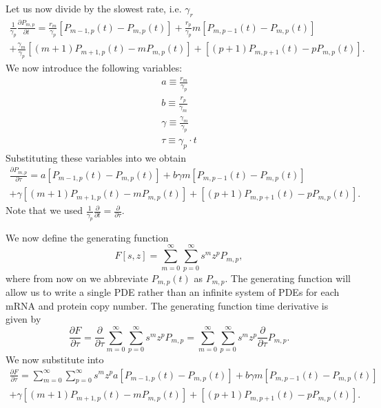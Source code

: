 Let us now divide by the slowest rate, i.e. $\gamma_r$
\begin{equation}
\begin{aligned}
\frac{1}{\gamma_p} \frac{\partial P_{m,p}}{\partial t} =
\frac{r_m}{\gamma_p} \left[ P_{m-1,p}(t) - P_{m,p}(t) \right]
+ \frac{r_p}{\gamma_p} m  \left[ P_{m, p-1}(t) - P_{m, p}(t) \right]\\
+ \frac{\gamma_m}{\gamma_p} \left[ (m + 1) P_{m+1,p}(t) - m P_{m, p}(t)
\right]
+ \left[ (p + 1) P_{m, p+1}(t) - p P_{m, p}(t) \right].
\end{aligned}
\label{eq_cme_over_gammap}
\end{equation}
We now introduce the following variables:
\begin{align}
  a \equiv \frac{r_m}{\gamma_p}\\
  b \equiv \frac{r_p}{\gamma_m}\\
  \gamma \equiv \frac{\gamma_m}{\gamma_p}\\
  \tau \equiv \gamma_p \cdot t
\end{align}
Substituting these variables into  we obtain
\begin{equation}
\begin{aligned}
\frac{\partial P_{m,p}}{\partial \tau} =
a \left[ P_{m-1,p}(t) - P_{m,p}(t) \right]
+ b \gamma m  \left[ P_{m, p-1}(t) - P_{m, p}(t) \right]\\
+ \gamma \left[ (m + 1) P_{m+1,p}(t) - m P_{m, p}(t) \right]
+ \left[ (p + 1) P_{m, p+1}(t) - p P_{m, p}(t) \right].
\end{aligned}
\label{eq_cme_tau}
\end{equation}
Note that we used $\frac{1}{\gamma_p}\frac{\partial}{\partial t} =
\frac{\partial}{\partial \tau}$.

We now define the generating function
\begin{equation}
F\left[ s, z \right] = \sum_{m=0}^{\infty} \sum_{p=0}^{\infty} s^m z^p P_{m, p},
\end{equation}
where from now on we abbreviate $P_{m, p}(t)$ as $P_{m, p}$. The generating
function will allow us to write a single PDE rather than an infinite system of
PDEs for each mRNA and protein copy number. The generating function time
derivative is given by
\begin{equation}
\frac{\partial F}{\partial \tau} =
\frac{\partial}{\partial \tau} \sum_{m=0}^{\infty} \sum_{p=0}^{\infty} s^m z^p
P_{m, p} =
\sum_{m=0}^{\infty}
\sum_{p=0}^{\infty} s^m z^p \frac{\partial}{\partial \tau} P_{m, p}.
\label{eq_dF_dtau}
\end{equation}
We now substitute  into \eref[eq_dF_dtau]
\begin{equation}
\begin{aligned}
\frac{\partial F}{\partial \tau} =
\sum_{m=0}^{\infty} \sum_{p=0}^{\infty} s^m z^p a \left[ P_{m-1,p}(t) -
P_{m,p}(t) \right]
+ b \gamma m  \left[ P_{m, p-1}(t) - P_{m, p}(t) \right]\\
+ \gamma \left[ (m + 1) P_{m+1,p}(t) - m P_{m, p}(t) \right]
+ \left[ (p + 1) P_{m, p+1}(t) - p P_{m, p}(t) \right].
\end{aligned}
\label{eq_dF_dtau_complete}
\end{equation}

